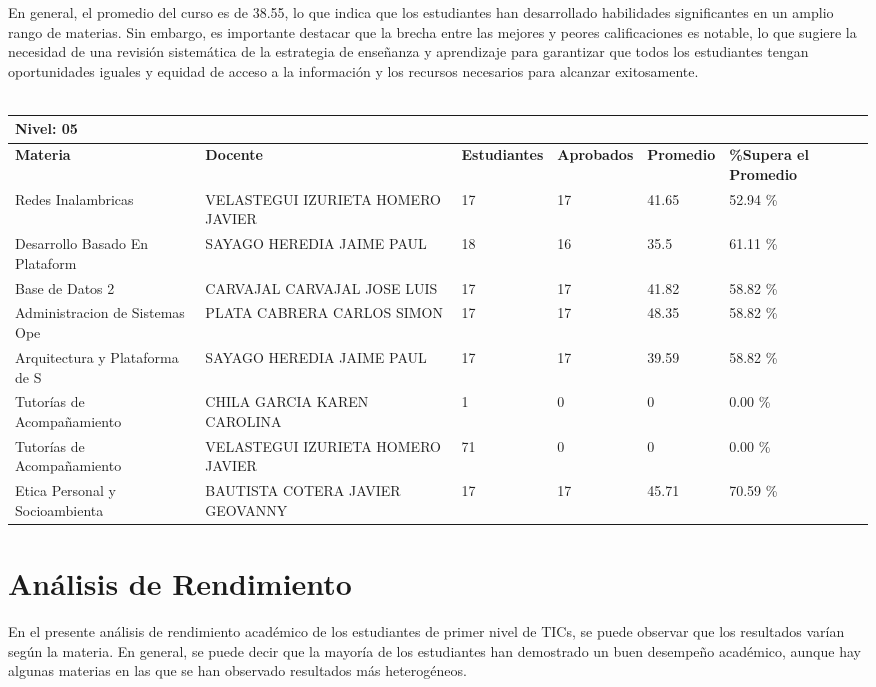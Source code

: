 En general, el promedio del curso es de 38.55, lo que indica que los estudiantes han desarrollado habilidades significantes en un amplio rango de materias. Sin embargo, es importante destacar que la brecha entre las mejores y peores calificaciones es notable, lo que sugiere la necesidad de una revisión sistemática de la estrategia de enseñanza y aprendizaje para garantizar que todos los estudiantes tengan oportunidades iguales y equidad de acceso a la información y los recursos necesarios para alcanzar exitosamente.\\
\vspace{1cm}\\\small
\begin{tabularx}{\textwidth}{|p{2.5cm}|p{2.5cm}|X|X|X|X|}
\hline
\multicolumn{6}{|X|}{\textbf{Nivel: 05 }}\\\hline\textbf{Materia} & \textbf{Docente} & \textbf{Estudiantes} & \textbf{Aprobados} & \textbf{Promedio} & \textbf{\%Supera el Promedio} \\ \hline
Redes Inalambricas & VELASTEGUI IZURIETA HOMERO JAVIER & 17 & 17 & 41.65 & 52.94 \%\\ \hline
Desarrollo Basado En Plataform & SAYAGO HEREDIA JAIME PAUL & 18 & 16 & 35.5 & 61.11 \%\\ \hline
Base de Datos 2 & CARVAJAL CARVAJAL JOSE LUIS & 17 & 17 & 41.82 & 58.82 \%\\ \hline
Administracion de Sistemas Ope & PLATA CABRERA CARLOS SIMON & 17 & 17 & 48.35 & 58.82 \%\\ \hline
Arquitectura y Plataforma de S & SAYAGO HEREDIA JAIME PAUL & 17 & 17 & 39.59 & 58.82 \%\\ \hline
Tutorías de Acompañamiento & CHILA GARCIA KAREN CAROLINA & 1 & 0 & 0 & 0.00 \%\\ \hline
Tutorías de Acompañamiento & VELASTEGUI IZURIETA HOMERO JAVIER & 71 & 0 & 0 & 0.00 \%\\ \hline
Etica Personal y Socioambienta & BAUTISTA COTERA JAVIER GEOVANNY & 17 & 17 & 45.71 & 70.59 \%\\ \hline
\end{tabularx}

\vspace{1cm}
\section{Análisis de Rendimiento}
En el presente análisis de rendimiento académico de los estudiantes de primer nivel de TICs, se puede observar que los resultados varían según la materia. En general, se puede decir que la mayoría de los estudiantes han demostrado un buen desempeño académico, aunque hay algunas materias en las que se han observado resultados más heterogéneos.

